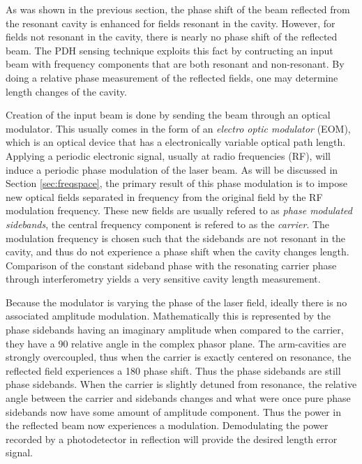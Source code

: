 As was shown in the previous section, the phase shift of the beam reflected from the resonant cavity is enhanced for fields resonant in the cavity. %
However, for fields not resonant in the cavity, there is nearly no phase shift of the reflected beam. %
The PDH sensing technique exploits this fact by contructing an input beam with frequency components that are both resonant and non-resonant. %
By doing a relative phase measurement of the reflected fields, one may determine length changes of the cavity.

Creation of the input beam is done by sending the beam through an optical modulator. %
This usually comes in the form of an \emph{electro optic modulator} (EOM), which is an optical device that has a electronically variable optical path length. %
Applying a periodic electronic signal, usually at radio frequencies (RF), will induce a periodic phase modulation of the laser beam. %
As will be discussed in Section \ref{sec:freqspace}, the primary result of this phase modulation is to impose new optical fields separated in frequency from the original field by the RF modulation frequency. %
These new fields are usually refered to as \emph{phase modulated sidebands}, the central frequency component is refered to as the \emph{carrier}. The modulation frequency is chosen such that the sidebands are not resonant in the cavity, and thus do not experience a phase shift when the cavity changes length. %
Comparison of the constant sideband phase with the resonating carrier phase through interferometry yields a very sensitive cavity length measurement. %


Because the modulator is varying the phase of the laser field, ideally there is no associated amplitude modulation. %
Mathematically this is represented by the phase sidebands having an imaginary amplitude when compared to the carrier, they have a 90\degrees{} relative angle in the complex phasor plane. %
The arm-cavities are strongly overcoupled, thus when the carrier is exactly centered on resonance, the reflected field experiences a 180\degrees{} phase shift. %
Thus the phase sidebands are still phase sidebands. %
When the carrier is slightly detuned from resonance, the relative angle between the carrier and sidebands changes and what were once pure phase sidebands now have some amount of amplitude component. %
Thus the power in the reflected beam now experiences a modulation. %
Demodulating the power recorded by a photodetector in reflection will provide the desired length error signal.

